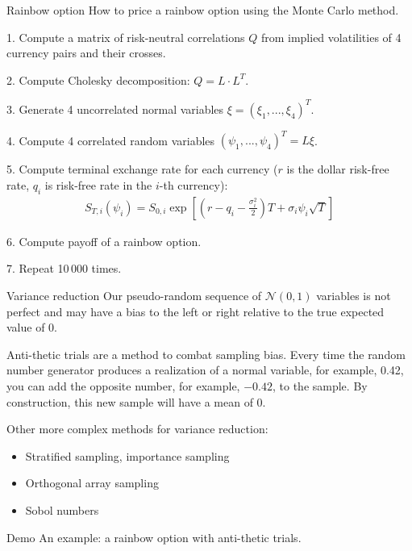 \documentclass{beamer}
\begin{document}
\begin{frame}{Rainbow option}
\justify
How to price a rainbow option using the Monte Carlo method.

1. Compute a matrix of risk-neutral correlations $Q$ from implied volatilities of 4 currency pairs and their crosses.

2. Compute Cholesky decomposition: $Q = L \cdot L^T$.

3. Generate 4 uncorrelated normal variables $\xi = (\xi_1,...,\xi_4)^T$.

4. Compute 4 correlated random variables $(\psi_1,...,\psi_4)^T = L\xi$.

5. Compute terminal exchange rate for each currency  ($r$ is the dollar risk-free rate, $q_i$ is risk-free rate in the $i$-th currency):
\begin{align*}
S_{T,i}(\psi_i) = S_{0,i}\exp\left[\left(r - q_i - \frac{\sigma_i^2}{2}\right)T + \sigma_i\psi_i\sqrt{T}\right]
\end{align*}

6. Compute payoff of a rainbow option.

7. Repeat 10\,000 times.
\end{frame}



\begin{frame}{Variance reduction}
\justify
Our pseudo-random sequence of $\mathcal{N}(0,1)$ variables is not perfect and may have a bias to the left or right relative to the true expected value of 0.

\justify
\alert{Anti-thetic trials} are a method to combat sampling bias. Every time the random number generator produces a realization of a normal variable, for example, 0.42, you can add the opposite number, for example, $-0.42$, to the sample. By construction, this new sample will have a mean of 0.

\justify
Other more complex methods for variance reduction:
\begin{itemize}
\item  Stratified sampling, importance sampling
\item Orthogonal array sampling
\item Sobol numbers
\end{itemize}
\end{frame}



\begin{frame}{Demo}
\justify
An example: a rainbow option with anti-thetic trials.
\end{frame}
\end{document}
